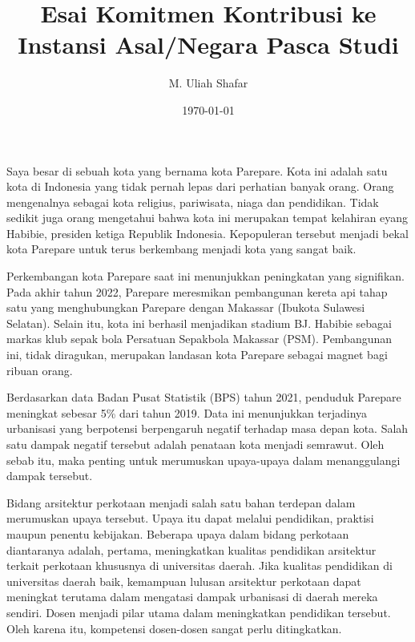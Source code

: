\documentclass[../main.tex]{subfiles}
\title{
	\textbf{Esai Komitmen Kontribusi ke Instansi Asal/Negara Pasca Studi}\\} %
\date{\today}
\author{M. Uliah Shafar}
\begin{document}
\maketitle

Saya besar di sebuah kota yang bernama kota Parepare.
Kota ini adalah satu kota di Indonesia yang tidak pernah lepas dari perhatian banyak orang.
Orang mengenalnya sebagai kota religius, pariwisata, niaga dan pendidikan.
Tidak sedikit juga orang mengetahui bahwa kota ini merupakan tempat kelahiran eyang Habibie, presiden ketiga Republik Indonesia.
Kepopuleran tersebut menjadi bekal kota Parepare untuk terus berkembang menjadi kota yang sangat baik.

Perkembangan kota Parepare saat ini menunjukkan peningkatan yang signifikan.
Pada akhir tahun 2022, Parepare meresmikan pembangunan kereta api tahap satu yang menghubungkan Parepare dengan Makassar (Ibukota Sulawesi Selatan).
Selain itu, kota ini berhasil menjadikan stadium BJ. Habibie sebagai markas klub sepak bola Persatuan Sepakbola Makassar (PSM).
Pembangunan ini, tidak diragukan, merupakan landasan kota Parepare sebagai magnet bagi ribuan orang.


Berdasarkan data Badan Pusat Statistik (BPS) tahun 2021, penduduk Parepare meningkat sebesar 5\% dari tahun 2019.
Data ini menunjukkan terjadinya urbanisasi yang berpotensi berpengaruh negatif terhadap masa depan kota. Salah satu dampak negatif tersebut adalah penataan kota menjadi semrawut.
Oleh sebab itu, maka penting untuk merumuskan upaya-upaya dalam menanggulangi dampak tersebut.






Bidang arsitektur perkotaan menjadi salah satu bahan terdepan dalam merumuskan upaya tersebut. Upaya itu dapat melalui pendidikan, praktisi maupun penentu kebijakan.
Beberapa upaya dalam bidang perkotaan diantaranya adalah, pertama, meningkatkan kualitas pendidikan arsitektur terkait perkotaan khususnya di universitas daerah.
Jika kualitas pendidikan di universitas daerah baik,  kemampuan lulusan arsitektur perkotaan dapat meningkat terutama dalam mengatasi dampak urbanisasi di daerah mereka sendiri.
Dosen menjadi pilar utama dalam meningkatkan pendidikan tersebut. Oleh karena itu, kompetensi dosen-dosen sangat perlu ditingkatkan.
\end{document}
